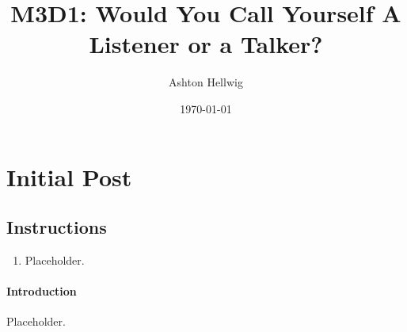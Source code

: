 \documentclass[stu,12pt]{apa7}
\title{%
    M3D1: Would You Call Yourself A Listener or a Talker?
  }
\author{Ashton Hellwig}
\date{\today}
\begin{document}
  \maketitle

  \section{Initial Post}
    \subsection*{Instructions}
      \begin{enumerate}
        \item Placeholder.
      \end{enumerate}


      \newpage
      \paragraph{Introduction}
        Placeholder.




  \newpage
  \nocite{*}
  \printbibliography[%
    title={Additional References},%
    heading={bibintoc},%
    category={consulted}%
  ]
\end{document}
